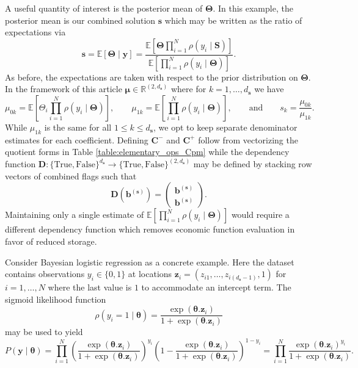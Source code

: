 \documentclass[graybox]{svmult}
\begin{document}
A useful quantity of interest is the posterior mean of $\boldsymbol{\Theta}$. In this example, the posterior mean is our combined solution $\boldsymbol{s}$ which may be written as the ratio of expectations via
$$\boldsymbol{s} = \mathbb{E}\left[\boldsymbol{\Theta} \mid \boldsymbol{y}\right] = \frac{\mathbb{E}\left[\boldsymbol{\Theta} \prod_{i=1}^{N} \rho(y_i \mid \boldsymbol{S})\right]}{\mathbb{E}\left[\prod_{i=1}^{N} \rho(y_i \mid \boldsymbol{\Theta})\right]}.$$
As before, the expectations are taken with respect to the prior distribution on $\boldsymbol{\Theta}$. In the framework of this article $\boldsymbol{\mu} \in \mathbb{R}^{(2, d_{\boldsymbol{s}})}$ where for $k=1,\dots,d_{\boldsymbol{s}}$ we have 
$$\mu_{0k} = \mathbb{E}\left[\Theta_i \prod_{i=1}^{N} \rho(y_i \mid \boldsymbol{\Theta})\right], \qquad \mu_{1k} = \mathbb{E}\left[\prod_{i=1}^{N} \rho(y_i \mid \boldsymbol{\Theta})\right], \qquad \text{and} \qquad s_k = \frac{\mu_{0k}}{\mu_{1k}}.$$
While $\mu_{1k}$ is the same for all $1 \leq k \leq d_{\boldsymbol{s}}$, we opt to keep separate denominator estimates for each coefficient. Defining $\boldsymbol{C}^-$ and $\boldsymbol{C}^+$ follow from vectorizing the quotient forms in Table \ref{table:elementary_ops_Cpm} while the dependency function $\boldsymbol{D}: \{\text{True},\text{False}\}^{d_{\boldsymbol{s}}} \to \{\text{True},\text{False}\}^{(2, d_{\boldsymbol{s}})}$ may be defined by stacking row vectors of combined flags such that
$$\boldsymbol{D}\left(\boldsymbol{b}^{(\boldsymbol{s})}\right) = \begin{pmatrix} \boldsymbol{b}^{(\boldsymbol{s})} \\ \boldsymbol{b}^{(\boldsymbol{s})} \end{pmatrix}.$$
Maintaining only a single estimate of $\mathbb{E}\left[\prod_{i=1}^{N} \rho(y_i \mid \boldsymbol{\Theta})\right]$ would require a different dependency function which removes economic function evaluation in favor of reduced storage. 

Consider Bayesian logistic regression as a concrete example. Here the dataset contains observations $y_i \in \{0,1\}$ at locations $\boldsymbol{z}_i = \left(z_{i1},\dots,z_{i(d_{\boldsymbol{s}}-1)},1\right)$ for $i=1,\dots,N$ where the last value is $1$ to accommodate an intercept term. The sigmoid likelihood function
$$\rho(y_i = 1 \mid \boldsymbol{\theta}) = \frac{\exp(\boldsymbol{\theta}.\boldsymbol{z}_i)}{1+\exp(\boldsymbol{\theta}.\boldsymbol{z}_i)}$$
may be used to yield
$$P(\boldsymbol{y} \mid \boldsymbol{\theta}) = \prod_{i=1}^N \left(\frac{\exp(\boldsymbol{\theta}.\boldsymbol{z}_i)}{1+\exp(\boldsymbol{\theta}.\boldsymbol{z}_i)}\right)^{y_i} \left(1-\frac{\exp(\boldsymbol{\theta}.\boldsymbol{z}_i)}{1+\exp(\boldsymbol{\theta}.\boldsymbol{z}_i)}\right)^{1-y_i} = \prod_{i=1}^N \frac{\exp(\boldsymbol{\theta}.\boldsymbol{z}_i)^{y_i}}{1+\exp(\boldsymbol{\theta}.\boldsymbol{z}_i)}.$$
\end{document}
